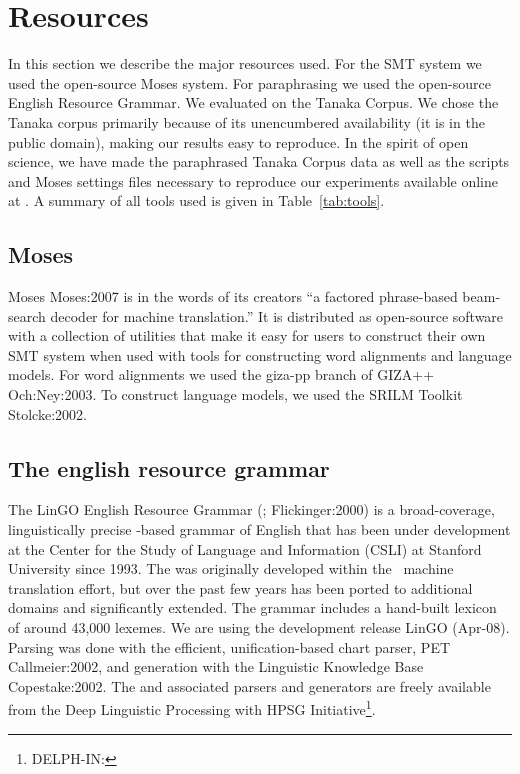 \documentclass[english]{jnlp_1.4}
\newcommand{\url}[1]{}
\newcommand{\citep}{}
\newcommand{\erg}{}
\newcommand{\verbmobil}{}
\newcommand{\hpsg}{}
\begin{document}
\section{Resources}

In this section we describe the major resources used. For the SMT
system we used the open-source Moses system. 
For paraphrasing we used the open-source English Resource Grammar. We
evaluated on the Tanaka Corpus. We chose the Tanaka corpus primarily
because of its unencumbered availability (it is in the public domain),
making our results easy to reproduce. In the spirit of open science,
we have made the paraphrased Tanaka Corpus data as well as the scripts
and Moses settings files necessary to reproduce our experiments
available online at \url{http://www3.ntu.edu.sg/home/fcbond/data/}.  A
summary of all tools used is given in Table~\ref{tab:tools}.

\begin{table}[p]

\end{table}



\subsection{Moses}


Moses \citep{Moses:2007} is in the words of its creators ``a factored
phrase-based beam-search decoder for machine translation.'' It is
distributed as open-source software with a collection of utilities
that make it easy for users to construct their own SMT system when
used with tools for constructing word alignments and language models.
    For word alignments we used the giza-pp branch of GIZA++
\citep{Och:Ney:2003}.
To construct language models, we used the SRILM Toolkit
\citep{Stolcke:2002}.



\subsection{The english resource grammar}

The LinGO English Resource Grammar (\erg; \citep{Flickinger:2000}) is
a broad-coverage, linguistically precise \hpsg-based grammar of
English that has been under development at the Center for the Study of
Language and Information (CSLI) at Stanford University since 1993.
The \erg was originally developed within the \verbmobil\ machine
translation effort, but over the past few years has been ported to
additional domains and significantly extended. The grammar includes a
hand-built lexicon of around 43,000 lexemes. We are using the
    development release LinGO (Apr-08). Parsing was done with the
efficient, unification-based chart parser, PET \citep{Callmeier:2002},
and generation with the Linguistic Knowledge Base
\citep{Copestake:2002}.  The \erg and associated parsers and
generators are freely available from the Deep Linguistic Processing
with HPSG Initiative\footnote{DELPH-IN:
\url{http://www.delph-in.net/}}.
\end{document}
